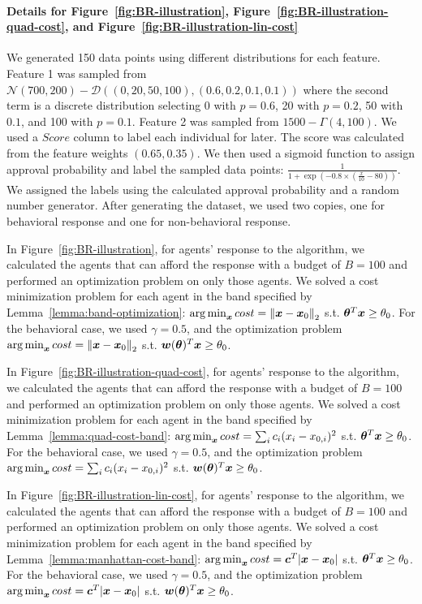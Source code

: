 \paragraph{Details for Figure~\ref{fig:BR-illustration}, Figure~\ref{fig:BR-illustration-quad-cost}, and Figure~\ref{fig:BR-illustration-lin-cost}} We generated 150 data points using different distributions for each feature. Feature 1 was sampled from $\mathcal{N}(700, 200)-\mathcal{D}((0, 20, 50, 100),(0.6, 0.2, 0.1, 0.1))$ where the second term is a discrete distribution selecting 0 with $p=0.6$, 20 with $p=0.2$, 50 with $0.1$, and 100 with $p=0.1$. Feature 2 was sampled from $1500-\Gamma(4, 100)$. We used a $Score$ column to label each individual for later. The score was calculated from the feature weights $(0.65, 0.35)$. We then used a sigmoid function to assign approval probability and label the sampled data points: $\frac{1}{1+\exp(-0.8\times (\frac{x}{10}-80))}$. We assigned the labels using the calculated approval probability and a random number generator. After generating the dataset, we used two copies, one for behavioral response and one for non-behavioral response. 

In Figure~\ref{fig:BR-illustration}, for agents' response to the algorithm, we calculated the agents that can afford the response with a budget of $B=100$ and performed an optimization problem on only those agents. We solved a cost minimization problem for each agent in the band specified by Lemma~\ref{lemma:band-optimization}: $\operatorname*{arg\,min}_{\bm{x}} cost=\norm{{\bm{x}}-{\bm{x}}_0}_2$ s.t. ${\bm{\theta}}^T{\bm{x}}\ge\theta_0$. For the behavioral case, we used $\gamma=0.5$, and the optimization problem $\operatorname*{arg\,min}_{\bm{x}} cost=\norm{{\bm{x}}-{\bm{x}}_0}_2$ s.t. ${\bm{w}}({\bm{\theta}})^T{\bm{x}}\ge\theta_0$. 

In Figure~\ref{fig:BR-illustration-quad-cost}, for agents' response to the algorithm, we calculated the agents that can afford the response with a budget of $B=100$ and performed an optimization problem on only those agents. We solved a cost minimization problem for each agent in the band specified by Lemma~\ref{lemma:quad-cost-band}: $\operatorname*{arg\,min}_{\bm{x}} cost=\sum_i c_i(x_i-x_{0, i})^2$ s.t. ${\bm{\theta}}^T{\bm{x}}\ge\theta_0$. For the behavioral case, we used $\gamma=0.5$, and the optimization problem $\operatorname*{arg\,min}_{\bm{x}} cost=\sum_i c_i(x_i-x_{0, i})^2$ s.t. ${\bm{w}}({\bm{\theta}})^T{\bm{x}}\ge\theta_0$. 

In Figure~\ref{fig:BR-illustration-lin-cost}, for agents' response to the algorithm, we calculated the agents that can afford the response with a budget of $B=100$ and performed an optimization problem on only those agents. We solved a cost minimization problem for each agent in the band specified by Lemma~\ref{lemma:manhattan-cost-band}: $\operatorname*{arg\,min}_{\bm{x}} cost={\bm{c}}^T|{\bm{x}}-{\bm{x}}_0|$ s.t. ${\bm{\theta}}^T{\bm{x}}\ge\theta_0$. For the behavioral case, we used $\gamma=0.5$, and the optimization problem $\operatorname*{arg\,min}_{\bm{x}} cost={\bm{c}}^T|{\bm{x}}-{\bm{x}}_0|$ s.t. ${\bm{w}}({\bm{\theta}})^T{\bm{x}}\ge\theta_0$. 
